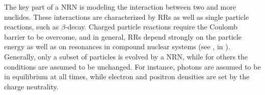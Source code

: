 The key part of a \ac{NRN} is modeling the interaction between two 
and more nuclides. These interactions are characterized by \acp{RR} 
as well as single particle reactions, such as $\beta$-decay. 
Charged particle reactions require the Coulomb barrier to be overcome, 
and in general, \acp{RR} depend strongly on the particle energy as well 
as on resonances in compound nuclear systems (see \eg,  
in \citet{Clayton:1968}). 
%
%
%
%
Generally, only a subset of particles is evolved by a \ac{NRN}, while 
for others the conditions are assumed to be unchanged. For instance, 
photons are assumed to be in equilibrium at all 
times, while electron and positron densities are set by the charge 
neutrality. 

